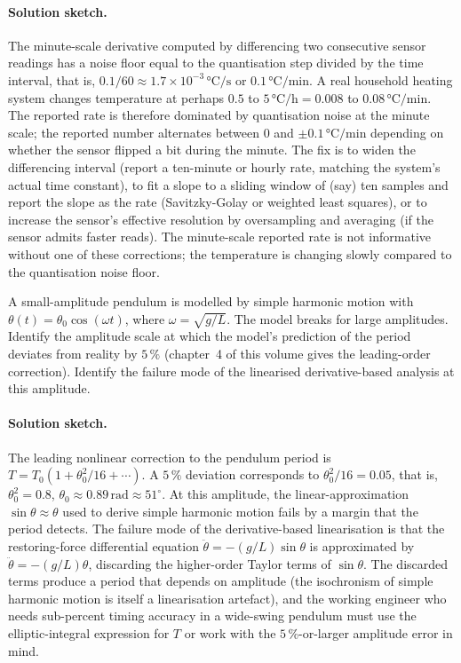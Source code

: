 \paragraph{Solution sketch.}
The minute-scale derivative computed by differencing two
consecutive sensor readings has a noise floor equal to the
quantisation step divided by the time interval, that is, $0.1 /
60 \approx 1.7 \times 10^{-3} \,\si{\degreeCelsius\per\second}$
or $0.1 \,\si{\degreeCelsius\per\minute}$. A real household
heating system changes temperature at perhaps
$0.5$ to $5 \,\si{\degreeCelsius\per\hour} = 0.008$ to $0.08
\,\si{\degreeCelsius\per\minute}$. The reported rate is therefore
dominated by quantisation noise at the minute scale; the
reported number alternates between $0$ and $\pm 0.1 \,\si{
\degreeCelsius\per\minute}$ depending on whether the sensor
flipped a bit during the minute. The fix is to widen the
differencing interval (report a ten-minute or hourly rate,
matching the system's actual time constant), to fit a slope to
a sliding window of (say) ten samples and report the slope as
the rate (Savitzky-Golay or weighted least squares), or to
increase the sensor's effective resolution by oversampling and
averaging (if the sensor admits faster reads). The minute-scale
reported rate is not informative without one of these
corrections; the temperature is changing slowly compared to the
quantisation noise floor.

\begin{exercise}
A small-amplitude pendulum is modelled by simple harmonic motion
with $\theta(t) = \theta_{0} \cos(\omega t)$, where $\omega =
\sqrt{g/L}$. The model breaks for large amplitudes. Identify the
amplitude scale at which the model's prediction of the period
deviates from reality by $5\,\%$ (chapter~4 of this volume gives
the leading-order correction). Identify the failure mode of the
linearised derivative-based analysis at this amplitude.
\end{exercise}

\paragraph{Solution sketch.}
The leading nonlinear correction to the pendulum period is
$T = T_{0} (1 + \theta_{0}^{2} / 16 + \cdots)$. A $5\,\%$
deviation corresponds to $\theta_{0}^{2}/16 = 0.05$, that is,
$\theta_{0}^{2} = 0.8$, $\theta_{0} \approx 0.89 \,\si{\radian}
\approx 51^{\circ}$. At this amplitude, the linear-approximation
$\sin\theta \approx \theta$ used to derive simple harmonic
motion fails by a margin that the period detects. The failure
mode of the derivative-based linearisation is that the
restoring-force differential equation $\ddot\theta = -(g/L)\sin
\theta$ is approximated by $\ddot\theta = -(g/L)\theta$,
discarding the higher-order Taylor terms of $\sin\theta$. The
discarded terms produce a period that depends on amplitude (the
isochronism of simple harmonic motion is itself a
linearisation artefact), and the working engineer who needs
sub-percent timing accuracy in a wide-swing pendulum must use
the elliptic-integral expression for $T$ or work with the
$5\,\%$-or-larger amplitude error in mind.

